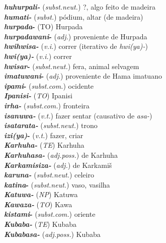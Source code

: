 \begin{multicols}{2}
\begin{hangparas}{1em}{1}
		\textbf{\emph{huhurpali-}} (\emph{subst.neut.}) \tabto{1em} {?}, algo feito de madeira\\
		\textbf{\emph{humati-}} (\emph{subst.}) \tabto{1em} pódium, altar (de madeira)\\
		\textbf{\emph{hurpada}-} (TO) \tabto{1em} Hurpada\\
		\textbf{\emph{hurpadawani}-} (\emph{adj.}) \tabto{1em} proveniente de Hurpada\\
		\textbf{\emph{hwihwisa-}} (\emph{v.i.}) \tabto{1em} correr (iterativo de \emph{hwi{(ya)}-})\\
		\textbf{\emph{hwi{(ya)}-}} (\emph{v.i.}) \tabto{1em} correr\\
		\textbf{\emph{hwisar}-} (\emph{subst.neut.}) \tabto{1em} fera, animal selvagem\\
		\textbf{\emph{imatuwani}-} (\emph{adj.}) \tabto{1em} proveniente de Hama \tabto{1em} imatuano\\
		\textbf{\emph{ipami}-} (\emph{subst.com.}) \tabto{1em} ocidente\\
		\textbf{\emph{Ipanisi-}} (\emph{TO}) \tabto{1em} Ipanisi\\
		\textbf{\emph{irha-}} (\emph{subst.com.}) \tabto{1em} fronteira\\
		\textbf{\emph{isanuwa-}} (\emph{v.t.}) \tabto{1em} fazer sentar (causativo de \emph{asa-})\\
		\textbf{\emph{isatarata-}} (\emph{subst.neut.}) \tabto{1em} trono\\
		\textbf{\emph{izi{(ya)}}-} (\emph{v.t.}) \tabto{1em} fazer, criar\\
		\textbf{\emph{Karhuha-}} (\emph{TE}) \tabto{1em} Karhuha\\
		\textbf{\emph{Karhuhasa-}} (\emph{adj.poss.}) \tabto{1em} de Karhuha\\
		\textbf{\emph{Karkamisiza-}} (\emph{adj.}) \tabto{1em} de Karkamiš\\
		\textbf{\emph{karuna-}} (\emph{subst.neut.}) \tabto{1em} celeiro\\
		\textbf{\emph{katina}-} (\emph{subst.neut.}) \tabto{1em} vaso, vasilha\\
		\textbf{\emph{Katuwa-}} (\emph{NP}) \tabto{1em} Katuwa\\
		\textbf{\emph{Kawaza-}} (\emph{TO}) \tabto{1em} Kawa\\
		\textbf{\emph{kistami}-} (\emph{subst.com.}) \tabto{1em} oriente\\
		\textbf{\emph{Kubaba-}} (\emph{TE}) \tabto{1em} Kubaba\\
		\textbf{\emph{Kubabasa-}} (\emph{adj.poss.}) \tabto{1em} Kubaba\\

\end{hangparas}
\end{multicols}
